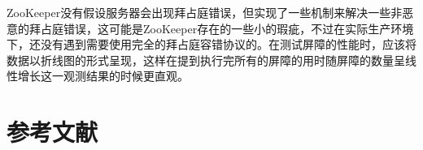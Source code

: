 \documentclass[UTF8]{article}
\begin{document}
ZooKeeper没有假设服务器会出现拜占庭错误，但实现了一些机制来解决一些非恶意的拜占庭错误，这可能是ZooKeeper存在的一些小的瑕疵，不过在实际生产环境下，还没有遇到需要使用完全的拜占庭容错协议的。在测试屏障的性能时，应该将数据以折线图的形式呈现，这样在提到执行完所有的屏障的用时随屏障的数量呈线性增长这一观测结果的时候更直观。

\section*{参考文献}
\end{document}
